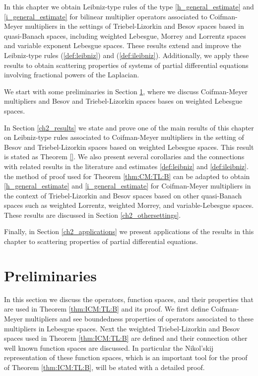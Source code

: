 \documentclass[10pt,a4paper]{article}
\theoremstyle{remark}
\begin{document}
                                                                                                                                                                                                                                                                                                                                                                          

In this chapter we obtain Leibniz-type rules of the type \eqref{h_general_estimate} and \eqref{i_general_estimate} for bilinear multiplier operators associated to Coifman-Meyer multipliers in the settings of Triebel-Lizorkin and Besov spaces based in quasi-Banach spaces, including weighted Lebesgue, Morrey and Lorrentz spaces and variable exponent Lebesgue spaces. These results extend and improve the Leibniz-type rules (\ref{def:leibniz}) and (\ref{def:ileibniz}).  Additionally, we apply these results to obtain scattering properties of systems of partial differential equations involving fractional powers of the Laplacian. 

We start with some preliminaries in Section \ref{ch2_prelim}, where we discuss Coifman-Meyer multipliers and Besov and Triebel-Lizorkin spaces bases on weighted Lebesgue spaces.

In Section \ref{ch2_results} we state and prove one of the main results of this chapter on Leibniz-type rules associated to Coifman-Meyer multipliers in the setting of Besov and Triebel-Lizorkin spaces based on weighted Lebesgue spaces. This result is stated as Theorem \ref{}. We also present several corollaries and the connections with related results in the literature and estimates \eqref{def:leibniz} and \eqref{def:ileibniz}. the method of proof used for Theorem \ref{thm:CM:TL:B} can be adapted to obtain \eqref{h_general_estimate} and \eqref{i_general_estimate} for Coifman-Meyer multipliers in the context of Triebel-Lizorkin and Besov spaces based on other quasi-Banach spaces such as weighted Lorrentz, weighted Morrey, and variable-Lebesgue spaces. These results are discussed in Section \ref{ch2_othersettings}.

Finally, in Section \ref{ch2_applications} we present applications of the results in this chapter to scattering properties of partial differential equations. 

\section{Preliminaries}\label{ch2_prelim}
In this section we discuss the operators, function spaces, and their properties that are used in Theorem \ref{thm:ICM:TL:B} and its proof. We first define Coifman-Meyer multipliers and see boundedness properties of operators associated to these multipliers in Lebesgue spaces. Next the weighted Triebel-Lizorkin and Besov spaces used in Theorem \ref{thm:ICM:TL:B} are defined and their connection other well known function spaces are discussed. In particular the Nikol'skij representation of these function spaces, which is an important tool for the proof of Theorem \ref{thm:ICM:TL:B}, will be stated with a detailed proof.
\end{document}
